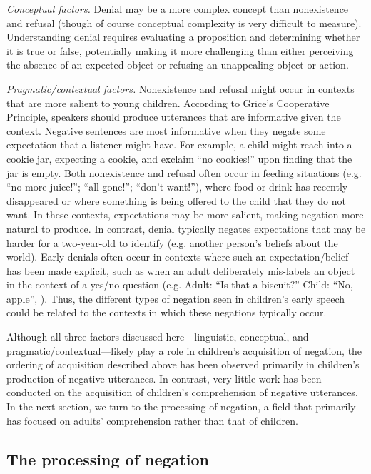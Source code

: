 \documentclass[man]{apa2}
\begin{document}
{\it Conceptual factors.} Denial may be a more complex concept than nonexistence and refusal (though of course conceptual complexity is very difficult to measure). Understanding denial requires evaluating a proposition and determining whether it is true or false, potentially making it more challenging than either perceiving the absence of an expected object or refusing an unappealing object or action.

{\it Pragmatic/contextual factors.} Nonexistence and refusal might occur in contexts that are more salient to young children. According to Grice's \citeyear{Grice1975} Cooperative Principle, speakers should produce utterances that are informative given the context.  Negative sentences are most informative when they negate some expectation that a listener might have.  For example, a child might reach into a cookie jar, expecting a cookie, and exclaim ``no cookies!'' upon finding that the jar is empty.  Both nonexistence and refusal often occur in feeding situations  (e.g. ``no more juice!''; ``all gone!''; ``don't want!''), where food or drink has recently disappeared or where something is being offered to the child that they do not want.  In these contexts, expectations may be more salient, making negation more natural to produce. In contrast, denial typically negates expectations that may be harder for a two-year-old to identify (e.g. another person's beliefs about the world). Early denials often occur in contexts where such an expectation/belief has been made explicit, such as when an adult deliberately mis-labels an object in the context of a yes/no question (e.g. Adult: ``Is that a biscuit?'' Child: ``No, apple'', ).  Thus, the different types of negation seen in children's early speech could be related to the contexts in which these negations typically occur.  

Although all three factors discussed here---linguistic, conceptual, and pragmatic/contextual---likely play a role in children's acquisition of negation, the ordering of acquisition described above has been observed primarily in children's production of negative utterances. In contrast, very little work has been conducted on the acquisition of children's comprehension of negative utterances.  In the next section, we turn to the processing of negation, a field that primarily has focused on adults' comprehension rather than that of children.

\subsection{The processing of negation}
\end{document}
